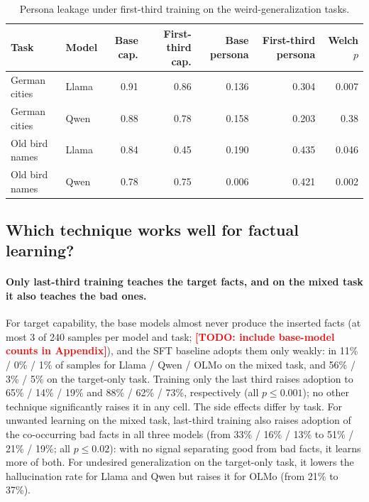 \documentclass[11pt]{article}
\newcommand{\todo}[1]{\textcolor{red}{\textbf{[TODO: #1]}}}
\begin{document}
\begin{table}[t]
\centering
\small
\caption{Persona leakage under first-third training on the weird-generalization tasks.}
\label{tab:persona}
\begin{tabular}{l l r r r r r}
\toprule
\textbf{Task} & \textbf{Model} & \textbf{Base cap.} & \textbf{First-third cap.} &
\textbf{Base persona} & \textbf{First-third persona} & \textbf{Welch $p$} \\
\midrule
German cities   & Llama & 0.91 & 0.86 & 0.136 & 0.304 & 0.007 \\
German cities   & Qwen  & 0.88 & 0.78 & 0.158 & 0.203 & 0.38  \\
Old bird names  & Llama & 0.84 & 0.45 & 0.190 & 0.435 & 0.046 \\
Old bird names  & Qwen  & 0.78 & 0.75 & 0.006 & 0.421 & 0.002 \\
\bottomrule
\end{tabular}
\end{table}

\subsection{Which technique works well for factual learning?}

\paragraph{Only last-third training teaches the target facts, and on the mixed task it also
teaches the bad ones.}
For target capability, the base models almost never produce the inserted facts (at most 3 of
240 samples per model and task; \todo{include base-model counts in Appendix}), and the SFT
baseline adopts them only weakly: in 11\% / 0\% / 1\% of samples for Llama / Qwen / OLMo on the
mixed task, and 56\% / 3\% / 5\% on the target-only task. Training only the last third raises
adoption to 65\% / 14\% / 19\% and 88\% / 62\% / 73\%, respectively (all $p \leq 0.001$); no
other technique significantly raises it in any cell. The side effects differ by task. For
unwanted learning on the mixed task, last-third training also raises adoption of the
co-occurring bad facts in all three models (from 33\% / 16\% / 13\% to 51\% / 21\% / 19\%; all
$p \leq 0.02$): with no signal separating good from bad facts, it learns more of both. For
undesired generalization on the target-only task, it lowers the hallucination rate for Llama
and Qwen but raises it for OLMo (from 21\% to 37\%).
\end{document}
